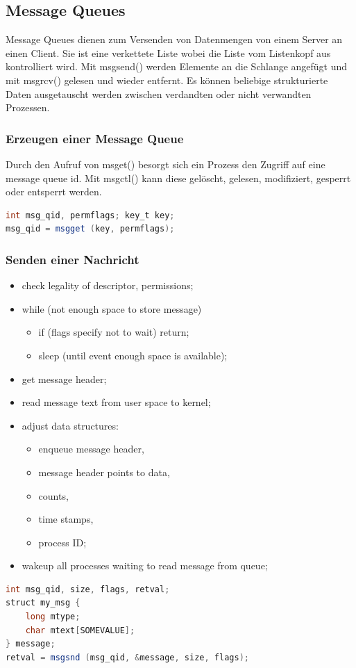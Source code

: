 \documentclass[10pt]{article}
\begin{document}
\newpage
\subsection{Message Queues}
Message Queues dienen zum Versenden von Datenmengen von einem Server an einen Client. Sie ist eine verkettete Liste wobei die Liste vom Listenkopf aus kontrolliert wird. Mit msgsend() werden Elemente an die Schlange angefügt und mit msgrcv() gelesen und wieder entfernt. Es können beliebige strukturierte Daten ausgetauscht werden zwischen verdandten oder nicht verwandten Prozessen.

\subsubsection{Erzeugen einer Message Queue}
Durch den Aufruf von msget() besorgt sich ein Prozess den Zugriff auf eine message queue id. Mit msgctl() kann diese gelöscht, gelesen, modifiziert, gesperrt oder entsperrt werden.
\begin{lstlisting}[language=Java, caption=Erzeugen einer Message Queue, style=JavaStyle]
int msg_qid, permflags; key_t key;
msg_qid = msgget (key, permflags);
\end{lstlisting}

\subsubsection{Senden einer Nachricht}
\begin{itemize}
	\item check legality of descriptor, permissions;
	\item while (not enough space to store message) 
		\begin{itemize}
			\item if (flags specify not to wait) return;
			\item sleep (until event enough space is available);
		\end{itemize}
	\item get message header;
	\item read message text from user space to kernel;
	\item adjust data structures:
		\begin{itemize}
			\item enqueue message header,
			\item message header points to data,
			\item counts,
			\item time stamps,
			\item process ID;
		\end{itemize}
	\item wakeup all processes waiting to read message from queue;
\end{itemize}
\begin{lstlisting}[language=Java, caption=Versenden einer Nachricht, style=JavaStyle]
int msg_qid, size, flags, retval;
struct my_msg {
	long mtype;
	char mtext[SOMEVALUE];
} message;
retval = msgsnd (msg_qid, &message, size, flags);
\end{lstlisting}
\end{document}
